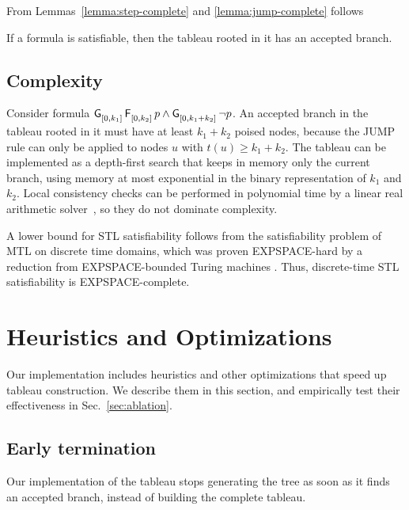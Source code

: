 \documentclass[acmsmall,screen]{acmart}
\begin{document}
From Lemmas~\ref{lemma:step-complete} and \ref{lemma:jump-complete} follows
\begin{theorem}[Completeness]
If a formula is satisfiable, then the tableau rooted in it has an accepted branch.
\end{theorem}


\subsection{Complexity}
\label{sec:complexity}

Consider formula $\mathop{\mathsf{\mathsf{G}}^{{}}_{[0, k_1]}} \mathop{\mathsf{\mathsf{F}}^{{}}_{[0, k_2]}} p \land \mathop{\mathsf{\mathsf{G}}^{{}}_{[0, k_1 + k_2]}} \neg p$.
An accepted branch in the tableau rooted in it must have at least $k_1 + k_2$ poised nodes,
because the \textsf{JUMP} rule can only be applied to nodes $u$ with $t(u) \geq k_1 + k_2$.
The tableau can be implemented as a depth-first search
that keeps in memory only the current branch,
using memory at most exponential in the binary representation of $k_1$ and $k_2$.
Local consistency checks can be performed in polynomial time by a linear real arithmetic solver~\cite{Khachiyan80}, so they do not dominate complexity.

A lower bound for STL satisfiability follows from the satisfiability problem
of MTL on discrete time domains, which was proven EXPSPACE-hard
by a reduction from EXPSPACE-bounded Turing machines \cite{AlurH93}.
Thus, discrete-time STL satisfiability is EXPSPACE-complete.


\section{Heuristics and Optimizations}
\label{sec:heur}

Our implementation includes heuristics and other optimizations that speed up tableau construction.
We describe them in this section, and empirically test their effectiveness in Sec.~\ref{sec:ablation}.

\subsection{Early termination}
\label{sec:early-termination}
Our implementation of the tableau stops generating the tree as soon as it finds an accepted branch,
instead of building the complete tableau.
\end{document}

